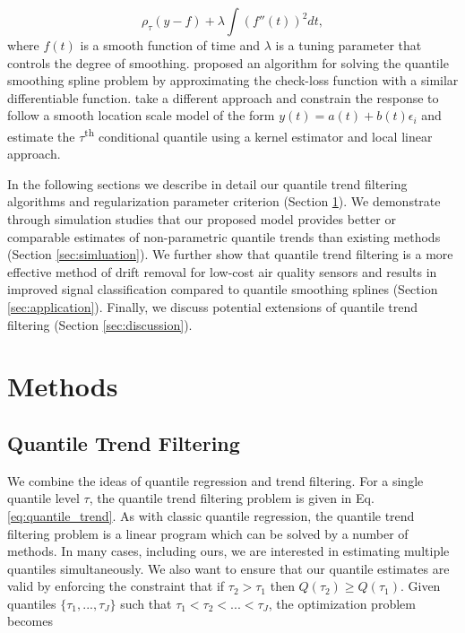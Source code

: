 \documentclass[12pt]{article}
\begin{document}
	\begin{equation*}
	\label{eq:smoothingspline}
	\rho_{\tau}(y - f) + \lambda\int (f''(t))^2 dt, 
 	\end{equation*}	
	where $f(t)$ is a smooth function of time and $\lambda$ is a tuning parameter that controls the degree of smoothing. \cite{Oh2011} proposed an algorithm for solving the quantile smoothing spline problem by approximating the check-loss function with a similar differentiable function. \cite{Racine2017} take a different approach and constrain the response to follow a smooth location scale model of the form $y(t) = a(t) + b(t)\epsilon_i$ and estimate the $\tau$\textsuperscript{th} conditional quantile using a kernel estimator and local linear approach. 

	In the following sections we describe in detail our quantile trend filtering algorithms and regularization parameter criterion (Section \ref{sec:methods}). We demonstrate through simulation studies that our proposed model provides better or comparable estimates of non-parametric quantile trends than existing methods (Section \ref{sec:simluation}). We further show that quantile trend filtering is a more effective method of drift removal for low-cost air quality sensors and results in improved signal classification compared to quantile smoothing splines (Section \ref{sec:application}). Finally, we discuss potential extensions of quantile trend filtering (Section \ref{sec:discussion}). 

	\section{Methods}
	\label{sec:methods}
	\subsection{Quantile Trend Filtering}

	We combine the ideas of quantile regression and trend filtering. For a single quantile level $\tau$, the quantile trend filtering problem is given in Eq. \ref{eq:quantile_trend}. As with classic quantile regression, the quantile trend filtering problem is a linear program which can be solved by a number of methods. In many cases, including ours, we are interested in estimating multiple quantiles simultaneously. We also want to ensure that our quantile estimates are valid by enforcing the constraint that if $\tau_2 > \tau_1$ then $Q(\tau_2) \ge Q(\tau_1)$. Given quantiles $\{\tau_1, ..., \tau_J\}$ such that $\tau_1 < \tau_2 < ... < \tau_J$, the optimization problem becomes 
	
\end{document}
